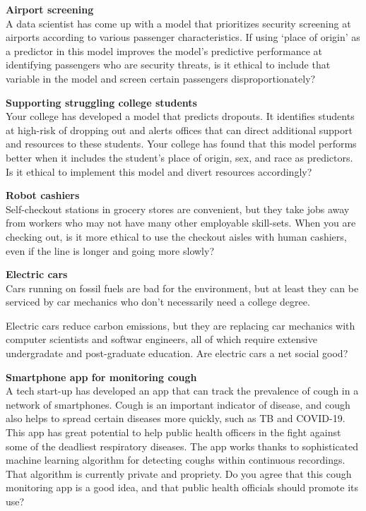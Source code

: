 \documentclass[]{book}
\begin{document}
\textbf{Airport screening}\\
A data scientist has come up with a model that prioritizes security screening at airports according to various passenger characteristics. If using `place of origin' as a predictor in this model improves the model's predictive performance at identifying passengers who are security threats, is it ethical to include that variable in the model and screen certain passengers disproportionately?

\textbf{Supporting struggling college students}\\
Your college has developed a model that predicts dropouts. It identifies students at high-risk of dropping out and alerts offices that can direct additional support and resources to these students. Your college has found that this model performs better when it includes the student's place of origin, sex, and race as predictors. Is it ethical to implement this model and divert resources accordingly?

\textbf{Robot cashiers}\\
Self-checkout stations in grocery stores are convenient, but they take jobs away from workers who may not have many other employable skill-sets. When you are checking out, is it more ethical to use the checkout aisles with human cashiers, even if the line is longer and going more slowly?

\textbf{Electric cars}\\
Cars running on fossil fuels are bad for the environment, but at least they can be serviced by car mechanics who don't necessarily need a college degree.

Electric cars reduce carbon emissions, but they are replacing car mechanics with computer scientists and softwar engineers, all of which require extensive undergradate and post-graduate education. Are electric cars a net social good?

\textbf{Smartphone app for monitoring cough}\\
A tech start-up has developed an app that can track the prevalence of cough in a network of smartphones. Cough is an important indicator of disease, and cough also helps to spread certain diseases more quickly, such as TB and COVID-19. This app has great potential to help public health officers in the fight against some of the deadliest respiratory diseases. The app works thanks to sophisticated machine learning algorithm for detecting coughs within continuous recordings. That algorithm is currently private and propriety. Do you agree that this cough monitoring app is a good idea, and that public health officials should promote its use?
\end{document}
